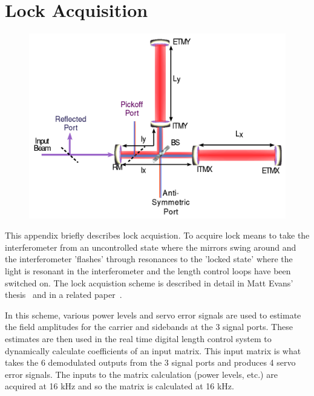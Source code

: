 \chapter{Lock Acquisition}
\label{app:LA}

\begin{figure}[!h]
\centerline{\includegraphics[angle=0,width=6.5in]{Figures/Chap3/IFO2.png}}
\end{figure}

This appendix briefly describes lock acquistion. To acquire lock means
to take the interferometer from an uncontrolled state where the mirrors
swing around and the interferometer 'flashes' through resonances to the
'locked state' where the light is resonant in the interferometer and the
length control loops have been switched on. The lock acquistion scheme is 
described in detail in Matt Evans'  thesis~\cite{Matt:Thesis} and in a 
related paper~\cite{Matt:LApaper}.

In this scheme, various power levels and servo error signals are used to estimate
the field amplitudes for the carrier and sidebands at the 3 signal ports. These
estimates are then used in the real time digital length control system to dynamically
calculate coefficients of an input matrix. This input matrix is what takes the
6 demodulated outputs from the 3 signal ports and produces 4 servo error signals. The
inputs to the matrix calculation (power levels, etc.) are acquired at 16 kHz and so the
matrix is calculated at 16 kHz.


